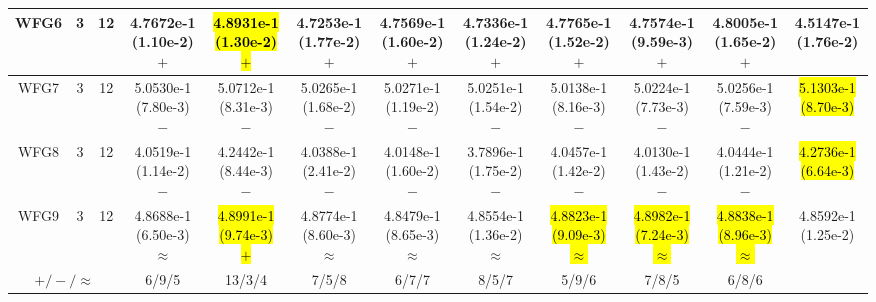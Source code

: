 \documentclass[journal]{IEEEtran}
\begin{document}
\begin{table*}[htbp]
\begin{tabular}{cccccccccccc}
\hline
\multirow{1}{*}{WFG6}&3&12&4.7672e-1 (1.10e-2) $+$&\hl{4.8931e-1 (1.30e-2) $+$}&4.7253e-1 (1.77e-2) $+$&4.7569e-1 (1.60e-2) $+$&4.7336e-1 (1.24e-2) $+$&4.7765e-1 (1.52e-2) $+$&4.7574e-1 (9.59e-3) $+$&4.8005e-1 (1.65e-2) $+$&4.5147e-1 (1.76e-2)\\
\hline
\multirow{1}{*}{WFG7}&3&12&5.0530e-1 (7.80e-3) $-$&5.0712e-1 (8.31e-3) $-$&5.0265e-1 (1.68e-2) $-$&5.0271e-1 (1.19e-2) $-$&5.0251e-1 (1.54e-2) $-$&5.0138e-1 (8.16e-3) $-$&5.0224e-1 (7.73e-3) $-$&5.0256e-1 (7.59e-3) $-$&\hl{5.1303e-1 (8.70e-3)}\\
\hline
\multirow{1}{*}{WFG8}&3&12&4.0519e-1 (1.14e-2) $-$&4.2442e-1 (8.44e-3) $-$&4.0388e-1 (2.41e-2) $-$&4.0148e-1 (1.60e-2) $-$&3.7896e-1 (1.75e-2) $-$&4.0457e-1 (1.42e-2) $-$&4.0130e-1 (1.43e-2) $-$&4.0444e-1 (1.21e-2) $-$&\hl{4.2736e-1 (6.64e-3)}\\
\hline
\multirow{1}{*}{WFG9}&3&12&4.8688e-1 (6.50e-3) $\approx$&\hl{4.8991e-1 (9.74e-3) $+$}&4.8774e-1 (8.60e-3) $\approx$&4.8479e-1 (8.65e-3) $\approx$&4.8554e-1 (1.36e-2) $\approx$&\hl{4.8823e-1 (9.09e-3) $\approx$}&\hl{4.8982e-1 (7.24e-3) $\approx$}&\hl{4.8838e-1 (8.96e-3) $\approx$}&4.8592e-1 (1.25e-2)\\
\hline
\multicolumn{3}{c}{$+/-/\approx$}&6/9/5&13/3/4&7/5/8&6/7/7&8/5/7&5/9/6&7/8/5&6/8/6&\\
\bottomrule
\end{tabular}
\label{No Label}
\end{table*}
\end{document}
